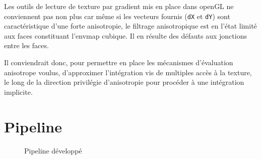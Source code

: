 \documentclass[10pt,a4paper,twoside, twocolumn]{report}
\newcommand*{\rootPath}{../}
\begin{document}
Les outils de lecture de texture par gradient mis en place dans openGL ne conviennent pas non plus car même si les vecteurs fournis (\texttt{dX} et \texttt{dY}) sont caractéristique d'une forte anisotropie, le filtrage anisotropique est en l'état limité aux faces constituant l'envmap cubique. Il en résulte des défauts aux jonctions entre les faces.

Il conviendrait donc, pour permettre en place les mécanismes d'évaluation anisotrope voulus, d'approximer l’intégration vis de multiples accès à la texture, le long de la direction privilégie d’anisotropie pour procéder à une intégration implicite.


\section{Pipeline}

\begin{figure*}[ht!]
	\centering
	
	\caption{Pipeline développé}
	\label{fig:tikz:pipeline}
\end{figure*}
\end{document}
